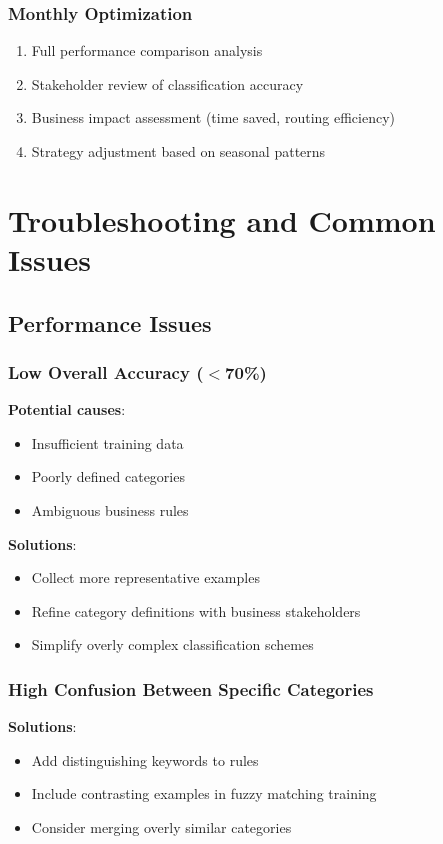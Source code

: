 \documentclass[11pt,a4paper]{article}
\begin{document}
\subsubsection{Monthly Optimization}
\begin{enumerate}
    \item Full performance comparison analysis
    \item Stakeholder review of classification accuracy
    \item Business impact assessment (time saved, routing efficiency)
    \item Strategy adjustment based on seasonal patterns
\end{enumerate}

\section{Troubleshooting and Common Issues}

\subsection{Performance Issues}

\subsubsection{Low Overall Accuracy ($<$70\%)}
\textbf{Potential causes}:
\begin{itemize}
    \item Insufficient training data
    \item Poorly defined categories
    \item Ambiguous business rules
\end{itemize}

\textbf{Solutions}:
\begin{itemize}
    \item Collect more representative examples
    \item Refine category definitions with business stakeholders
    \item Simplify overly complex classification schemes
\end{itemize}

\subsubsection{High Confusion Between Specific Categories}
\textbf{Solutions}:
\begin{itemize}
    \item Add distinguishing keywords to rules
    \item Include contrasting examples in fuzzy matching training
    \item Consider merging overly similar categories
\end{itemize}
\end{document}
